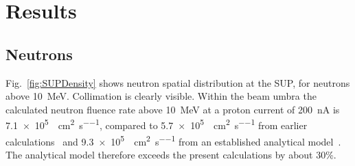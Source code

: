 \documentclass[11pt,a4paper]{IEEEtran}
\begin{document}
\section{Results}

\subsection{Neutrons}
Fig.~\ref{fig:SUPDensity} shows neutron spatial distribution at the SUP, for neutrons above \SI{10}{\MeV}.
Collimation is clearly visible.
Within the beam umbra the calculated neutron fluence rate above \SI{10}{\MeV} at a proton current of \SI{200}{\nA} is \SI{7.1e5}{\neutron\per\cm\squared\per\second}, compared to \SI{5.7e5}{\neutron\per\cm\squared\per\second} from earlier calculations~\cite{Platt2013} and \SI{9.3e5}{\neutron\per\cm\squared\per\second} from an established analytical model~\cite{Prokofiev2009}.
The analytical model therefore exceeds the present calculations by about 30\%.
\end{document}

